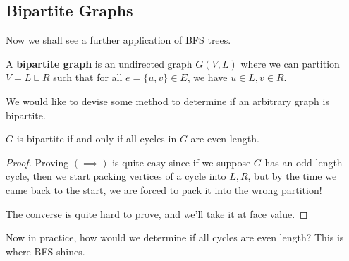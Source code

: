 \subsection{Bipartite Graphs}

  Now we shall see a further application of BFS trees. 

  \begin{definition}
    \label{def:bipartite-graph}
    A \textbf{bipartite graph} is an undirected graph $G(V, L)$ where we can partition $V = L \sqcup R$ such that for all $e = \{u, v\} \in E$, we have $u \in L, v \in R$.  
  \end{definition}

  We would like to devise some method to determine if an arbitrary graph is bipartite. 

  \begin{theorem}
    \label{thm:bipartiteness-via-even-cycles}
    $G$ is bipartite if and only if all cycles in $G$ are even length. 
  \end{theorem}
  \begin{proof}
    Proving $(\implies)$ is quite easy since if we suppose $G$ has an odd length cycle, then we start packing vertices of a cycle into $L, R$, but by the time we came back to the start, we are forced to pack it into the wrong partition! 

    The converse is quite hard to prove, and we'll take it at face value. 
  \end{proof}

  Now in practice, how would we determine if all cycles are even length? This is where BFS shines. 

